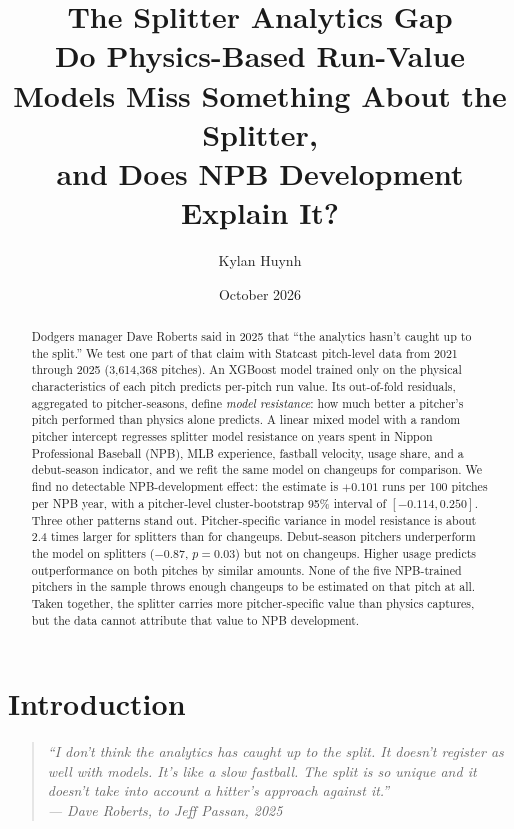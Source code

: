 \documentclass[11pt]{article}
\title{\textbf{The Splitter Analytics Gap}\\[4pt]
\large Do Physics-Based Run-Value Models Miss Something About the Splitter,\\
and Does NPB Development Explain It?}
\author{Kylan Huynh}
\date{October 2026}
\newcommand{\npbEst}{0.101}
\newcommand{\npbBootLo}{-0.114}
\newcommand{\npbBootHi}{0.250}
\begin{document}
\maketitle

\begin{abstract}
\noindent
Dodgers manager Dave Roberts said in 2025 that ``the analytics hasn't caught up to the split.'' We test one part of that claim with Statcast pitch-level data from 2021 through 2025 (3,614,368 pitches). An XGBoost model trained only on the physical characteristics of each pitch predicts per-pitch run value. Its out-of-fold residuals, aggregated to pitcher-seasons, define \emph{model resistance}: how much better a pitcher's pitch performed than physics alone predicts. A linear mixed model with a random pitcher intercept regresses splitter model resistance on years spent in Nippon Professional Baseball (NPB), MLB experience, fastball velocity, usage share, and a debut-season indicator, and we refit the same model on changeups for comparison. We find no detectable NPB-development effect: the estimate is $+\npbEst$ runs per 100 pitches per NPB year, with a pitcher-level cluster-bootstrap 95\% interval of $[\npbBootLo, \npbBootHi]$. Three other patterns stand out. Pitcher-specific variance in model resistance is about 2.4 times larger for splitters than for changeups. Debut-season pitchers underperform the model on splitters ($-0.87$, $p=0.03$) but not on changeups. Higher usage predicts outperformance on both pitches by similar amounts. None of the five NPB-trained pitchers in the sample throws enough changeups to be estimated on that pitch at all. Taken together, the splitter carries more pitcher-specific value than physics captures, but the data cannot attribute that value to NPB development.
\end{abstract}

\section{Introduction}

\begin{quote}
\itshape ``I don't think the analytics has caught up to the split. It doesn't register as well with models. It's like a slow fastball. The split is so unique and it doesn't take into account a hitter's approach against it.''
\upshape\\\hfill--- Dave Roberts, to Jeff Passan, 2025~\cite{passan2025}
\end{quote}
\end{document}

